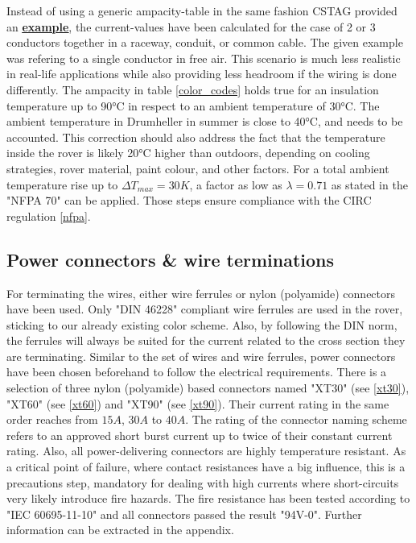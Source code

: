     Instead of using a generic ampacity-table in the same fashion CSTAG provided an \href{https://web.archive.org/web/20230310184047/https://www.coonerwire.com/amp-chart/}{\textbf{\underline{example}}}, the current-values have been calculated for the case of 2 or 3 conductors together in a raceway, conduit, or common cable. The given example was refering to a single conductor in free air. This scenario is much less realistic in real-life applications while also providing less headroom if the wiring is done differently. The ampacity in table \ref{color_codes} holds true for an insulation temperature up to 90°C in respect to an ambient temperature of 30°C. The ambient temperature in Drumheller in summer is close to 40°C, and needs to be accounted. This correction should also address the fact that the temperature inside the rover is likely 20°C higher than outdoors, depending on cooling strategies, rover material, paint colour, and other factors. For a total ambient temperature rise up to $\Delta T_{max} = 30K$, a factor as low as $\lambda = 0.71$ as stated in the "NFPA 70" can be applied. Those steps ensure compliance with the CIRC regulation \ref{nfpa}.


    \clearpage %

    \subsection{Power connectors \& wire terminations}

    For terminating the wires, either wire ferrules or nylon (polyamide) connectors have been used. Only "DIN 46228" compliant wire ferrules are used in the rover, sticking to our already existing color scheme. Also, by following the DIN norm, the ferrules will always be suited for the current related to the cross section they are terminating. Similar to the set of wires and wire ferrules, power connectors have been chosen beforehand to follow the electrical requirements. There is a selection of three nylon (polyamide) based connectors named "XT30" (see \ref{xt30}), "XT60" (see \ref{xt60}) and "XT90" (see \ref{xt90}). Their current rating in the same order reaches from $15A$, $30A$ to $40A$. The rating of the connector naming scheme refers to an approved short burst current up to twice of their constant current rating. Also, all power-delivering connectors are highly temperature resistant. As a critical point of failure, where contact resistances have a big influence, this is a precautions step, mandatory for dealing with high currents where short-circuits very likely introduce fire hazards. The fire resistance has been tested according to "IEC 60695-11-10" and all connectors passed the result "94V-0". Further information can be extracted in the appendix.

